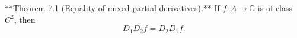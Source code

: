**Theorem 7.1 (Equality of mixed partial derivatives).** If $f: A \to \mathbb{C}$ is of class $C^2$, then
$$
D_1 D_2 f = D_2 D_1 f.
$$
